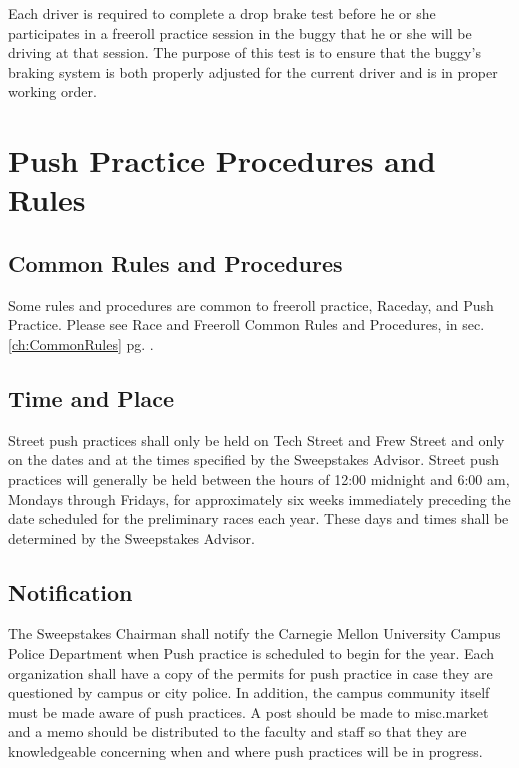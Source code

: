 	Each driver is required to complete a drop brake test before he or she participates in a freeroll practice session in the buggy that he or she will be driving at that session. The purpose of this test is to ensure that the buggy's braking system is both properly adjusted for the current driver and is in proper working order.
	
\section{Push Practice Procedures and Rules}
\label{sec:PushPRules}

\subsection{Common Rules and Procedures}
	Some rules and procedures are common to freeroll practice, Raceday, and Push Practice. Please see Race and Freeroll Common Rules and Procedures, in sec. \ref{ch:CommonRules} pg. \pageref{ch:CommonRules}.
	
\subsection{Time and Place}

	Street push practices shall only be held on Tech Street and Frew Street and only on the dates and at the times specified by the Sweepstakes Advisor. Street push practices will generally be held between the hours of 12:00 midnight and 6:00 am, Mondays through Fridays, for approximately six weeks immediately preceding the date scheduled for the preliminary races each year. These days and times shall be determined by the Sweepstakes Advisor.

\subsection{Notification}

	The Sweepstakes Chairman shall notify the Carnegie Mellon University Campus Police Department when Push practice is scheduled to begin for the year. Each organization shall have a copy of the permits for push practice in case they are questioned by campus or city police. In addition, the campus community itself must be made aware of push practices. A post should be made to misc.market and a memo should be distributed to the faculty and staff so that they are knowledgeable concerning when and where push practices will be in progress.

